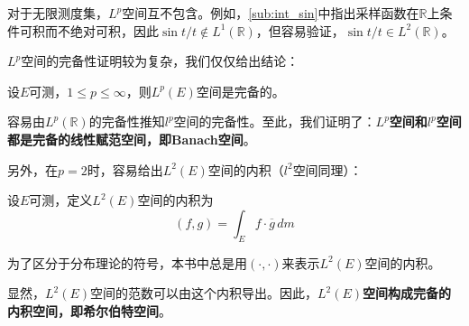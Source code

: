 对于无限测度集，$L^p$空间互不包含。例如，\ref{sub:int_sin}中指出采样函数在$\mathbb{R} $上条件可积而不绝对可积，因此$\sin t/t\notin L^1(\mathbb{R} )$，但容易验证，$\sin t/t\in L^2(\mathbb{R} )$。

$L^p$空间的完备性证明较为复杂，我们仅仅给出结论：
\begin{claim}
    设$E$可测，$1\leq p\leq \infty$，则$L^p(E)$空间是完备的。
\end{claim}
容易由$L^p(\mathbb{R} )$的完备性推知$l^p$空间的完备性。至此，我们证明了：\textbf{$L^p$空间和$l^p$空间都是完备的线性赋范空间，即Banach空间}。

另外，在$p=2$时，容易给出$L^2(E)$空间的内积（$l^2$空间同理）：
\begin{definition}[$L^2$空间的内积]
    设$E$可测，定义$L^2(E)$空间的内积为
    \[(f,g)=\int_{E}f\cdot \overline{g}\,dm\]
\end{definition}

为了区分于分布理论的符号，本书中总是用$(\cdot,\cdot)$来表示$L^2(E)$空间的内积。

显然，$L^2(E)$空间的范数可以由这个内积导出。因此，\textbf{$L^2(E)$空间构成完备的内积空间，即希尔伯特空间}。






